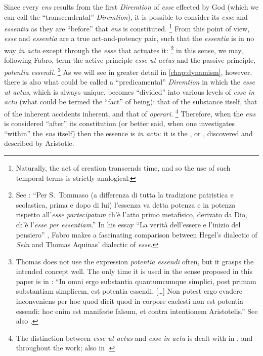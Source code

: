 Since every \emph{ens} results from the first \emph{Diremtion} of \emph{esse} effected by God (which we can call the ``transcendental'' \emph{Diremtion}), it is possible to consider its \emph{esse} and \emph{essentia} as they are ``before'' that \emph{ens} is constituted.%
%
\footnote{Naturally, the act of creation transcends time, and so the use of such temporal terms is strictly analogical.}
%
From this point of view, \emph{esse} and \emph{essentia} are a true act-and-potency pair, such that the \emph{essentia} is in no way \emph{in actu} except through the \emph{esse} that actuates it:%
%
\footnote{See \cite[40-41]{fabro:dallessere}: ``Per S.~Tommaso (a differenza di tutta la tradizione patristica e scolastica, prima e dopo di lui) l'essenza va detta potenza e in potenza rispetto all'\emph{esse partecipatum} ch'è l'atto primo metafisico, derivato da Dio, ch'è l'\emph{esse per essentiam}.'' In his essay ``La verità dell'essere e l'inizio del pensiero'' \parencite[11--69]{fabro:dallessere}, Fabro makes a fascinating comparison between Hegel's dialectic of \emph{Sein} and Thomas Aquinas' dialectic of \emph{esse}.}
%
in this sense, we may, following Fabro, term the active principle \emph{esse ut actus} and the passive principle, \emph{potentia essendi}.%
%
\footnote{Thomas does not use the expression \emph{potentia essendi} often, but it grasps the intended concept well. The only time it is used in the sense proposed in this paper is in \cite[VIII, lc.~21, n.~13]{st:phys}: ``In omni ergo substantia quantumcumque simplici, post primam substantiam simplicem, est potentia essendi. [\ldots] Non potest ergo evadere inconveniens per hoc quod dicit quod in corpore caelesti non est potentia essendi: hoc enim est manifeste falsum, et contra intentionem Aristotelis.'' See also \cite[30]{contat:esse-essentia-ordo}.}
%
As we will see in greater detail in \autoref{chap:dynamism}, however, there is also what could be called a ``predicamental'' \emph{Diremtion} in which the \emph{esse ut actus}, which is always unique, becomes ``divided'' into various levels of \emph{esse in actu} (what could be termed the ``fact'' of being): that of the substance itself, that of the inherent accidents inherent, and that of \emph{operari}.%
%
\footnote{The distinction between \emph{esse ut actus} and \emph{esse in actu} is dealt with in \cite[60--68]{fabro:partecipazione}, and throughout the work; also in \cite[117-125]{fabro:problematica}.}
%
Therefore, when the \emph{ens} is considered ``after'' its constitution (or better said, when one investigates ``within'' the \emph{ens} itself) then the essence is \emph{in actu}: it is the , or , discovered and described by Aristotle.

